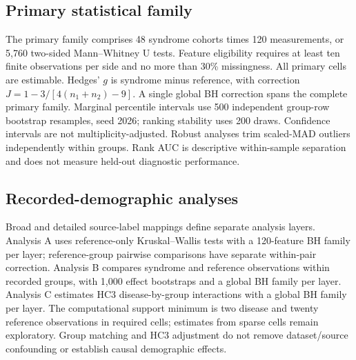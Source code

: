 \documentclass[11pt]{article}
\begin{document}
\subsection{Primary statistical family}
The primary family comprises 48 syndrome cohorts times 120 measurements, or 5,760 two-sided Mann--Whitney U tests. Feature eligibility requires at least ten finite observations per side and no more than 30\% missingness. All primary cells are estimable. Hedges' $g$ is syndrome minus reference, with correction $J=1-3/[4(n_1+n_2)-9]$. A single global BH correction spans the complete primary family. Marginal percentile intervals use 500 independent group-row bootstrap resamples, seed 2026; ranking stability uses 200 draws. Confidence intervals are not multiplicity-adjusted. Robust analyses trim scaled-MAD outliers independently within groups. Rank AUC is descriptive within-sample separation and does not measure held-out diagnostic performance.
\subsection{Recorded-demographic analyses}
Broad and detailed source-label mappings define separate analysis layers. Analysis A uses reference-only Kruskal--Wallis tests with a 120-feature BH family per layer; reference-group pairwise comparisons have separate within-pair correction. Analysis B compares syndrome and reference observations within recorded groups, with 1,000 effect bootstraps and a global BH family per layer. Analysis C estimates HC3 disease-by-group interactions with a global BH family per layer. The computational support minimum is two disease and twenty reference observations in required cells; estimates from sparse cells remain exploratory. Group matching and HC3 adjustment do not remove dataset/source confounding or establish causal demographic effects.
\end{document}
